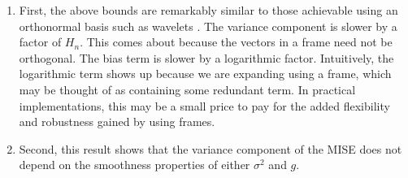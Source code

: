 \begin{remark}\mbox{}
  \begin{enumerate}  
    \item First, the above bounds are remarkably similar to those achievable using an orthonormal basis such as wavelets \citep{GenonCatalot1992}. The variance component is slower by a factor of $H_n$. This comes about because the vectors in a frame need not be orthogonal. The bias term is slower by a logarithmic factor. Intuitively, the logarithmic term shows up because we are expanding \bsv using a frame, which may be thought of as containing some redundant term. In practical implementations, this may be a small price to pay for the added flexibility and robustness gained by using frames. 
    \item Second, this result shows that the variance component of the MISE does not depend on the smoothness properties of either $\sigma^2$ and $g$.  
  \end{enumerate}
\end{remark}

